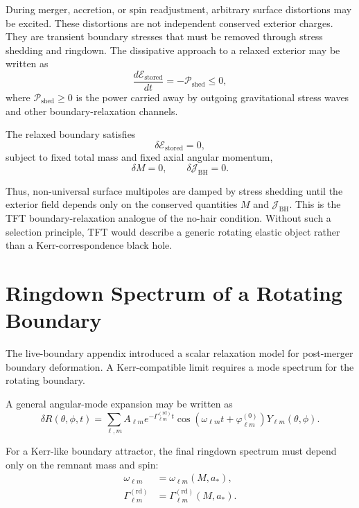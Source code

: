 During merger, accretion, or spin readjustment, arbitrary surface distortions may be excited. These distortions are not independent conserved exterior charges. They are transient boundary stresses that must be removed through stress shedding and ringdown. The dissipative approach to a relaxed exterior may be written as
\begin{equation}
    \frac{d\mathcal{E}_{\mathrm{stored}}}{dt}
    =
    -
    \mathcal{P}_{\mathrm{shed}}
    \leq
    0,
\end{equation}
where \(\mathcal{P}_{\mathrm{shed}}\geq0\) is the power carried away by outgoing gravitational stress waves and other boundary-relaxation channels.

The relaxed boundary satisfies
\begin{equation}
    \delta \mathcal{E}_{\mathrm{stored}}
    =
    0,
\end{equation}
subject to fixed total mass and fixed axial angular momentum,
\begin{equation}
    \delta M=0,
    \qquad
    \delta \mathcal{J}_{\mathrm{BH}}=0.
\end{equation}

Thus, non-universal surface multipoles are damped by stress shedding until the exterior field depends only on the conserved quantities \(M\) and \(\mathcal{J}_{\mathrm{BH}}\). This is the TFT boundary-relaxation analogue of the no-hair condition. Without such a selection principle, TFT would describe a generic rotating elastic object rather than a Kerr-correspondence black hole.

\section{Ringdown Spectrum of a Rotating Boundary}

The live-boundary appendix introduced a scalar relaxation model for post-merger boundary deformation. A Kerr-compatible limit requires a mode spectrum for the rotating boundary.

A general angular-mode expansion may be written as
\begin{equation}
    \delta R(\theta,\phi,t) = \sum_{\ell,m} A_{\ell m} e^{-\Gamma_{\ell m}^{(\mathrm{rd})}t} \cos \left( \omega_{\ell m}t+\varphi_{\ell m}^{(0)} \right) Y_{\ell m}(\theta,\phi).
\end{equation}

For a Kerr-like boundary attractor, the final ringdown spectrum must depend only on the remnant mass and spin:
\begin{align}
    \omega_{\ell m} &= \omega_{\ell m}(M,a_\ast), \\
    \Gamma_{\ell m}^{(\mathrm{rd})} &= \Gamma_{\ell m}^{(\mathrm{rd})}(M,a_\ast).
\end{align}

